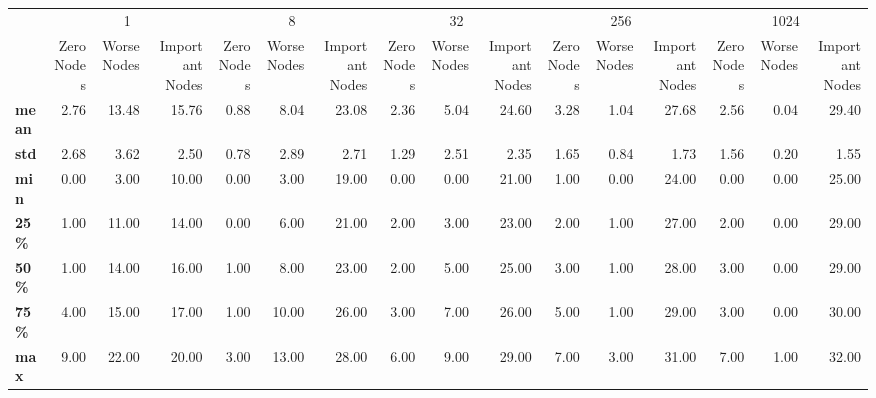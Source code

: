 \begin{tabular}{lrrrrrrrrrrrrrrr}
\toprule
{} & \multicolumn{3}{c}{1} & \multicolumn{3}{c}{8} & \multicolumn{3}{c}{32} & \multicolumn{3}{c}{256} & \multicolumn{3}{c}{1024} \\
{} & Zero Nodes & Worse Nodes & Important Nodes & Zero Nodes & Worse Nodes & Important Nodes & Zero Nodes & Worse Nodes & Important Nodes & Zero Nodes & Worse Nodes & Important Nodes & Zero Nodes & Worse Nodes & Important Nodes \\
\midrule
\textbf{mean} &       2.76 &       13.48 &           15.76 &       0.88 &        8.04 &           23.08 &       2.36 &        5.04 &           24.60 &       3.28 &        1.04 &           27.68 &       2.56 &        0.04 &           29.40 \\
\textbf{std } &       2.68 &        3.62 &            2.50 &       0.78 &        2.89 &            2.71 &       1.29 &        2.51 &            2.35 &       1.65 &        0.84 &            1.73 &       1.56 &        0.20 &            1.55 \\
\textbf{min } &       0.00 &        3.00 &           10.00 &       0.00 &        3.00 &           19.00 &       0.00 &        0.00 &           21.00 &       1.00 &        0.00 &           24.00 &       0.00 &        0.00 &           25.00 \\
\textbf{25\% } &       1.00 &       11.00 &           14.00 &       0.00 &        6.00 &           21.00 &       2.00 &        3.00 &           23.00 &       2.00 &        1.00 &           27.00 &       2.00 &        0.00 &           29.00 \\
\textbf{50\% } &       1.00 &       14.00 &           16.00 &       1.00 &        8.00 &           23.00 &       2.00 &        5.00 &           25.00 &       3.00 &        1.00 &           28.00 &       3.00 &        0.00 &           29.00 \\
\textbf{75\% } &       4.00 &       15.00 &           17.00 &       1.00 &       10.00 &           26.00 &       3.00 &        7.00 &           26.00 &       5.00 &        1.00 &           29.00 &       3.00 &        0.00 &           30.00 \\
\textbf{max } &       9.00 &       22.00 &           20.00 &       3.00 &       13.00 &           28.00 &       6.00 &        9.00 &           29.00 &       7.00 &        3.00 &           31.00 &       7.00 &        1.00 &           32.00 \\
\bottomrule
\end{tabular}
